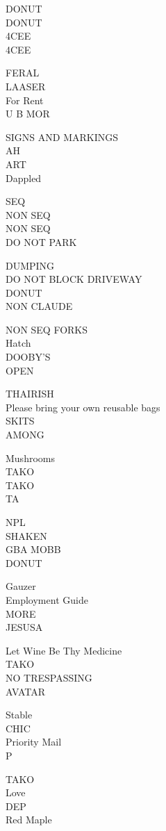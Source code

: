 \documentclass[10pt,letterpaper]{article}
\begin{document}
DONUT\\
DONUT\\
4CEE\\
4CEE

FERAL\\
LAASER\\
For Rent\\
U B MOR

SIGNS AND MARKINGS\\
AH\\
ART\\
Dappled

SEQ\\
NON SEQ\\
NON SEQ\\
DO NOT PARK

DUMPING\\
DO NOT BLOCK DRIVEWAY\\
DONUT\\
NON CLAUDE

NON SEQ FORKS\\
Hatch\\
DOOBY'S\\
OPEN

THAIRISH\\
Please bring your own reusable bags\\
SKITS\\
AMONG

Mushrooms\\
TAKO\\
TAKO\\
TA

NPL\\
SHAKEN\\
GBA MOBB\\
DONUT

Gauzer\\
Employment Guide\\
MORE\\
JESUSA

Let Wine Be Thy Medicine\\
TAKO\\
NO TRESPASSING\\
AVATAR

Stable\\
CHIC\\
Priority Mail\\
P

TAKO\\
Love\\
DEP\\
Red Maple
\end{document}
